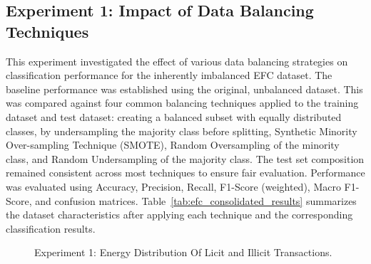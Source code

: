 \documentclass[12pt]{article}
\begin{document}
\subsection{Experiment 1: Impact of Data Balancing Techniques} \label{subsec:experiment_1}
This experiment investigated the effect of various data balancing strategies on classification performance for the inherently
imbalanced EFC dataset. The baseline performance was established using the original, unbalanced dataset. This was compared
against four common balancing techniques applied to the training dataset and test dataset: creating a balanced subset with
equally distributed classes, by undersampling the majority class before splitting, Synthetic Minority Over-sampling Technique
(SMOTE), Random Oversampling of the minority class, and Random Undersampling of the majority class. The test set composition
remained consistent across most techniques to ensure fair evaluation. Performance was evaluated using Accuracy, Precision,
Recall, F1-Score (weighted), Macro F1-Score, and confusion matrices. Table~\ref{tab:efc_consolidated_results} summarizes
the dataset characteristics after applying each technique and the corresponding classification results.

\begin{figure}[!tph]
  \centering
  \caption{Experiment 1: Energy Distribution Of Licit and Illicit Transactions.}
\end{figure}
\end{document}
